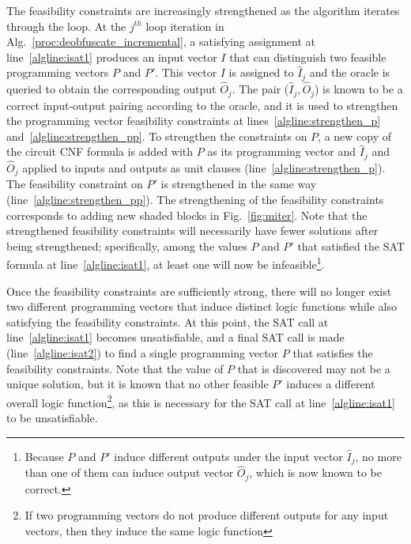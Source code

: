\documentclass[proposal]{umassthesis}  %
\begin{document}
The feasibility constraints are increasingly strengthened as the algorithm iterates through the loop. At the $j^{th}$ loop iteration in Alg.~\ref{proc:deobfuscate_incremental}, a satisfying assignment at line~\ref{algline:isat1} produces an input vector $I$ that can distinguish two feasible programming vectors $P$ and $P'$. This vector $I$ is assigned to $\widehat{I}_j$ and the oracle is queried to obtain the corresponding output $\widehat{O}_j$. {The pair ($\widehat{I}_j, \widehat{O}_j$) is known to be a correct input-output pairing according to the oracle, and it is used to strengthen the programming vector feasibility constraints at lines~\ref{algline:strengthen_p} and~\ref{algline:strengthen_pp}}. To strengthen the constraints on $P$, a new copy of the circuit CNF formula is added with $P$ as its programming vector and $\widehat{I}_j$ and $\widehat{O}_j$ applied to inputs and outputs as unit clauses (line~\ref{algline:strengthen_p}). The feasibility constraint on $P'$ is strengthened in the same way (line~\ref{algline:strengthen_pp}). {The strengthening of the feasibility constraints corresponds to adding new shaded blocks in Fig.~\ref{fig:miter}. Note that the strengthened feasibility constraints will necessarily have fewer solutions after being strengthened; specifically, among the values $P$ and $P'$ that satisfied the SAT formula at line~\ref{algline:isat1}, at least one will now be infeasible\footnote{Because $P$ and $P'$ induce different outputs under the input vector $\widehat{I}_j$, no more than one of them can induce output vector $\widehat{O}_j$, which is now known to be correct.}.}

Once the feasibility constraints are sufficiently strong, there will no longer exist two different programming vectors that induce distinct logic functions while also satisfying the feasibility constraints. At this point, the SAT call at line~\ref{algline:isat1} becomes unsatisfiable, and a final SAT call is made (line~\ref{algline:isat2}) to find a single programming vector $P$ that satisfies the feasibility constraints. Note that the value of $P$ that is discovered may not be a unique solution, but it is known that no other feasible $P'$ induces a different overall logic function\footnote{If two programming vectors do not produce different outputs for any input vectors, then they induce the same logic function}, as this is necessary for the SAT call at line~\ref{algline:isat1} to be unsatisfiable.
\end{document}
